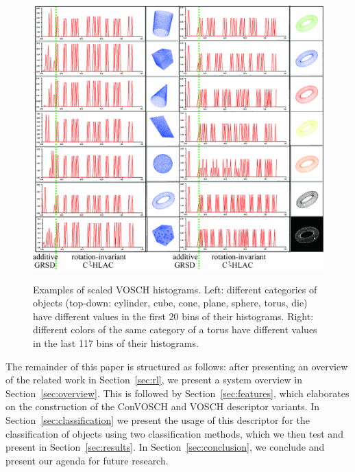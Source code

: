 \documentclass[a4paper, 10 pt, conference]{sty/ieeeconf}
\begin{document}
\begin{figure}[tb!]
  \begin{center}
    \includegraphics[width=.99\columnwidth]{figures/colorCHLAC/artificial/normalized_hist.jpg}
    \caption{Examples of scaled VOSCH histograms.
Left: different categories of objects (top-down: cylinder, cube, cone, plane, sphere, torus, die) 
have different values in the first 20 bins of their histograms.
Right: different colors of the same category of a torus have different values in the last 117 bins of their histograms.}
\vspace{-3ex}
    \label{fig:grsd_cchlac}
  \end{center}
\end{figure}

The remainder of this paper is structured as follows: after presenting an overview of the related
work in Section~\ref{sec:rl}, we present a system overview in Section~\ref{sec:overview}.
This is followed by Section~\ref{sec:features}, which elaborates on the construction of the
ConVOSCH and VOSCH descriptor variants. In Section~\ref{sec:classification} we present the usage of this descriptor
for the classification of objects using two classification methods, which we
then test and present in Section~\ref{sec:results}. In Section~\ref{sec:conclusion},
we conclude and present our agenda for future research.
\end{document}
